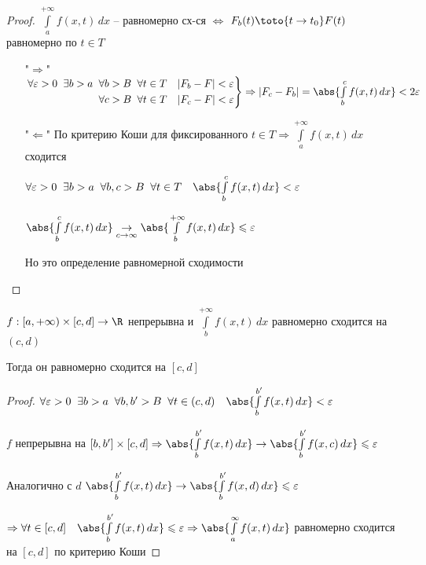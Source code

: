 \begin{proof}\thmslashn
	
	$\int\limits_a^{+\infty} f(x, t)\, dx$  -- равномерно сх-ся $\Leftrightarrow$ $F_b(t)  \toto{t\to t_0} F(t)$ равномерно по $t \in T$
	
	\begin{enumerate}
		\item ["$\Rightarrow$"]
		$
		\left.
		\begin{aligned}
		\forall \varepsilon > 0\;\; \exists b > a\;\; &\forall b > B\;\; \forall t \in T \quad |F_b - F| < \varepsilon \\
		&\forall c > B\;\; \forall t \in T \quad |F_c- F| < \varepsilon
		\end{aligned}
		\right\rbrace \Rightarrow |F_c - F_b| = \abs{\int\limits_{b}^{c}f(x, t)\,dx} < 2\varepsilon
		$
		
		\item["$\Leftarrow$"]
		По критерию Коши для фиксированного $t \in T \Rightarrow \int\limits_{a}^{+\infty}f(x, t)\,dx$  сходится
		
		$\forall \varepsilon > 0\;\; \exists b > a\;\; \forall b,c > B\;\; \forall t \in T\quad \abs{\int\limits_{b}^{c}f(x, t)\,dx} < \varepsilon$
		
		$\abs{\int\limits_{b}^{c}f(x, t)\,dx} \underset{c\to \infty}\to \abs{\int\limits_{b}^{+\infty}f(x, t)\,dx} \leqslant \varepsilon$
		
		Но это определение равномерной сходимости
		
	\end{enumerate}
	
\end{proof}

\begin{consequence}\thmslashn
	
	$f : [a, +\infty) \times [c, d] \to \R$ непрерывна и $\int\limits_{b}^{+\infty}f(x, t)\,dx$ равномерно сходится на $(c, d)$
	
	Тогда он равномерно сходится на $[c,d]$
	
\end{consequence}


\begin{proof}\thmslashn
	
	$\forall \varepsilon > 0\;\; \exists b > a\;\; \forall b,b' > B\;\; \forall t \in (c, d)\quad \abs{\int\limits_{b}^{b'}f(x, t)\,dx} < \varepsilon$
	
	$f$ непрерывна на $[b,b'] \times [c, d] \Rightarrow  \abs{\int\limits_{b}^{b'}f(x, t)\,dx} \to  \abs{\int\limits_{b}^{b'}f(x, c)\,dx} \leqslant \varepsilon$
	
	Аналогично с $d$ $\abs{\int\limits_{b}^{b'}f(x, t)\,dx} \to  \abs{\int\limits_{b}^{b'}f(x, d)\,dx} \leqslant \varepsilon$
	
	$\Rightarrow \forall t \in [c, d] \quad \abs{\int\limits_{b}^{b'}f(x, t)\,dx} \leqslant \varepsilon \Rightarrow \abs{\int\limits_{a}^{\infty}f(x, t)\,dx}$ равномерно сходится на $[c, d]$ по критерию Коши
	
\end{proof}

